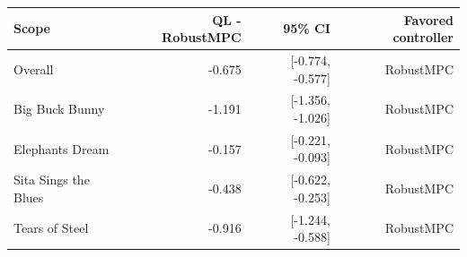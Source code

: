 \begin{tabular}{lrrr}
\toprule
Scope & QL - RobustMPC & 95\% CI & Favored controller \\
\midrule
Overall & -0.675 & [-0.774, -0.577] & RobustMPC \\
Big Buck Bunny & -1.191 & [-1.356, -1.026] & RobustMPC \\
Elephants Dream & -0.157 & [-0.221, -0.093] & RobustMPC \\
Sita Sings the Blues & -0.438 & [-0.622, -0.253] & RobustMPC \\
Tears of Steel & -0.916 & [-1.244, -0.588] & RobustMPC \\
\bottomrule
\end{tabular}

